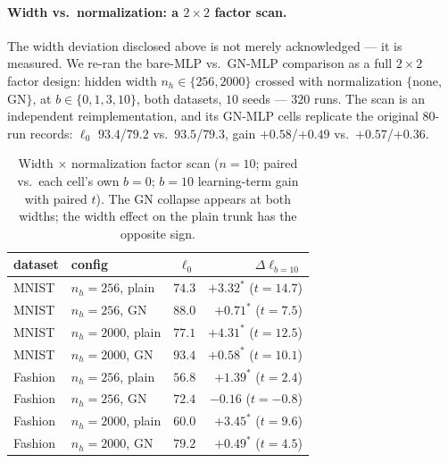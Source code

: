 \documentclass[review]{elsarticle}
\begin{document}
\paragraph{Width vs.\ normalization: a $2{\times}2$ factor scan.}
The width deviation disclosed above is not merely acknowledged --- it
is measured. We re-ran the bare-MLP vs.\ GN-MLP comparison as a full
$2{\times}2$ factor design: hidden width $n_h \in \{256, 2000\}$
crossed with normalization $\{$none, $\mathrm{GN}\}$, at $b \in
\{0,1,3,10\}$, both datasets, $10$ seeds --- $320$ runs. The scan is
an independent reimplementation, and its GN-MLP cells replicate the
original $80$-run records: $\ell_0$ $93.4$/$79.2$ vs.\
$93.5$/$79.3$, gain $+0.58$/$+0.49$ vs.\ $+0.57$/$+0.36$.

\begin{table}[t]
\centering\small
\caption{Width $\times$ normalization factor scan ($n{=}10$; paired
vs.\ each cell's own $b{=}0$; $b{=}10$ learning-term gain with paired
$t$). The GN collapse appears at both widths; the width effect on the
plain trunk has the opposite sign.}
\label{tab:twobytwo}
\begin{tabular}{llrr}
\toprule
dataset & config & $\ell_0$ & $\Delta\ell_{b=10}$ \\
\midrule
MNIST & $n_h{=}256$, plain & $74.3$ & $+3.32^{*}$ ($t{=}14.7$) \\
MNIST & $n_h{=}256$, GN    & $88.0$ & $+0.71^{*}$ ($t{=}7.5$) \\
MNIST & $n_h{=}2000$, plain & $77.1$ & $+4.31^{*}$ ($t{=}12.5$) \\
MNIST & $n_h{=}2000$, GN    & $93.4$ & $+0.58^{*}$ ($t{=}10.1$) \\
\midrule
Fashion & $n_h{=}256$, plain & $56.8$ & $+1.39^{*}$ ($t{=}2.4$) \\
Fashion & $n_h{=}256$, GN    & $72.4$ & $-0.16$ ($t{=}-0.8$) \\
Fashion & $n_h{=}2000$, plain & $60.0$ & $+3.45^{*}$ ($t{=}9.6$) \\
Fashion & $n_h{=}2000$, GN    & $79.2$ & $+0.49^{*}$ ($t{=}4.5$) \\
\bottomrule
\end{tabular}
\end{table}
\end{document}
